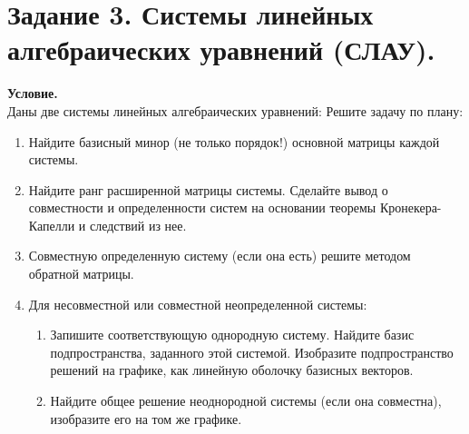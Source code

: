 \section{Задание 3. Системы линейных алгебраических уравнений (СЛАУ).}

\textbf{Условие.}\\
Даны две системы линейных алгебраических уравнений:
Решите задачу по плану:
\begin{enumerate}
    \item Найдите базисный минор (не только порядок!) основной матрицы каждой системы.
    \item Найдите ранг расширенной матрицы системы. Сделайте вывод о совместности и
    определенности систем на основании теоремы Кронекера-Капелли и следствий из нее.
    \item Совместную определенную систему (если она есть) решите методом обратной матрицы.
    \item Для несовместной или совместной неопределенной системы:
    \begin{enumerate}
        \item Запишите соответствующую однородную систему. Найдите базис подпространства,
        заданного этой системой. Изобразите подпространство решений на графике, как
        линейную оболочку базисных векторов.
        \item Найдите общее решение неоднородной системы (если она совместна), изобразите его на
        том же графике.
    \end{enumerate}
\end{enumerate}

